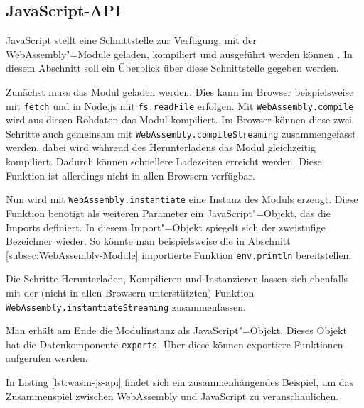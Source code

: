 \subsection{JavaScript-API}
\label{subsec:WebAssembly-JavaScript-API}
JavaScript stellt eine Schnittstelle zur Verfügung, mit der WebAssembly"=Module geladen, kompiliert und ausgeführt werden können \cite{MDNWebAssembly}. In diesem Abschnitt soll ein Überblick über diese Schnittstelle gegeben werden.

Zunächst muss das Modul geladen werden. Dies kann im Browser beispielsweise mit \lstinline{fetch} und in Node.js mit \lstinline{fs.readFile} erfolgen. Mit \lstinline{WebAssembly.compile} wird aus diesen Rohdaten das Modul kompiliert. Im Browser können diese zwei Schritte auch gemeinsam mit \lstinline{WebAssembly.compileStreaming} zusammengefasst werden, dabei wird während des Herunterladens das Modul gleichzeitig kompiliert. Dadurch können schnellere Ladezeiten erreicht werden. Diese Funktion ist allerdings nicht in allen Browsern verfügbar.

Nun wird mit \lstinline{WebAssembly.instantiate} eine Instanz des Moduls erzeugt. Diese Funktion benötigt als weiteren Parameter ein JavaScript"=Objekt, das die Imports definiert. In diesem Import"=Objekt spiegelt sich der zweistufige Bezeichner wieder. So könnte man beispielsweise die in Abschnitt \ref{subsec:WebAssembly-Module} importierte Funktion \lstinline{env.println} bereitstellen:



Die Schritte Herunterladen, Kompilieren und Instanzieren lassen sich ebenfalls mit der (nicht in allen Browsern unterstützten) Funktion \lstinline{WebAssembly.instantiateStreaming} zusammenfassen.

Man erhält am Ende die Modulinstanz als JavaScript"=Objekt. Dieses Objekt hat die Datenkomponente \lstinline{exports}. Über diese können exportiere Funktionen aufgerufen werden.

In Listing \ref{lst:wasm-js-api} findet sich ein zusammenhängendes Beispiel, um das Zusammenspiel zwischen WebAssembly und JavaScript zu veranschaulichen.




